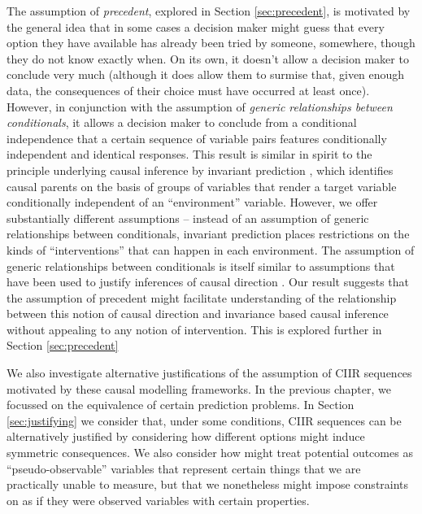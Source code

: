 The assumption of \emph{precedent}, explored in Section \ref{sec:precedent}, is motivated by the general idea that in some cases a decision maker might guess that every option they have available has already been tried by someone, somewhere, though they do not know exactly when. On its own, it doesn't allow a decision maker to conclude very much (although it does allow them to surmise that, given enough data, the consequences of their choice must have occurred at least once). However, in conjunction with the assumption of \emph{generic relationships between conditionals}, it allows a decision maker to conclude from a conditional independence that a certain sequence of variable pairs features conditionally independent and identical responses. This result is similar in spirit to the principle underlying causal inference by invariant prediction \citep{peters_causal_2016}, which identifies causal parents on the basis of groups of variables that render a target variable conditionally independent of an ``environment'' variable. However, we offer substantially different assumptions -- instead of an assumption of generic relationships between conditionals, invariant prediction places restrictions on the kinds of ``interventions'' that can happen in each environment. The assumption of generic relationships between conditionals is itself similar to assumptions that have been used to justify inferences of causal direction \citep{meek_strong_1995,lemeire_replacing_2013}. Our result suggests that the assumption of precedent might facilitate understanding of the relationship between this notion of causal direction and invariance based causal inference without appealing to any notion of intervention. This is explored further in Section \ref{sec:precedent}

We also investigate alternative justifications of the assumption of CIIR sequences motivated by these causal modelling frameworks. In the previous chapter, we focussed on the equivalence of certain prediction problems. In Section \ref{sec:justifying} we consider that, under some conditions, CIIR sequences can be alternatively justified by considering how different options might induce symmetric consequences. We also consider how might treat potential outcomes as ``pseudo-observable'' variables that represent certain things that we are practically unable to measure, but that we nonetheless might impose constraints on as if they were observed variables with certain properties.


